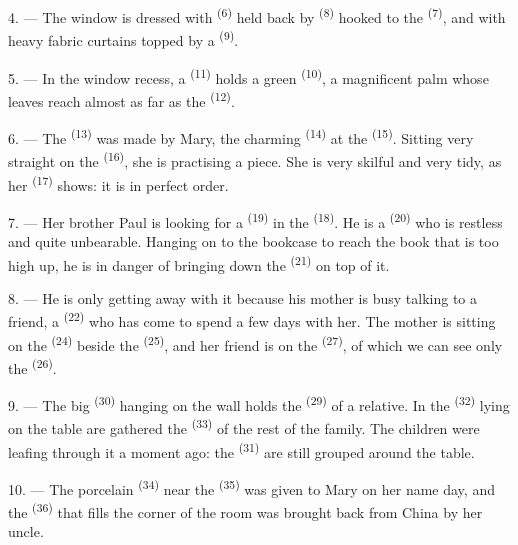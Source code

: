 4. --- The window is dressed with  \textsuperscript{(6)} held back by
 \textsuperscript{(8)} hooked to the  \textsuperscript{(7)}, and
with heavy fabric curtains topped by a
 \textsuperscript{(9)}.

5. --- In the window recess, a  \textsuperscript{(11)} holds a green
 \textsuperscript{(10)}, a magnificent palm whose leaves reach almost as far as
the  \textsuperscript{(12)}.

6. --- The  \textsuperscript{(13)} was made by Mary, the charming
 \textsuperscript{(14)} at the  \textsuperscript{(15)}.
Sitting very straight on the  \textsuperscript{(16)}, she is practising a piece.
She is very skilful and very tidy, as her
 \textsuperscript{(17)} shows: it is in perfect order.

\VUsaut{5.0mm}
\VUsaut{3.0mm}

7. --- Her brother Paul is looking for a  \textsuperscript{(19)} in the
 \textsuperscript{(18)}. He is a  \textsuperscript{(20)} who is
restless and quite unbearable. Hanging on to the bookcase to reach the book that is too high
up, he is in danger of bringing down the
 \textsuperscript{(21)} on top of it.

8. --- He is only getting away with it because his mother is busy talking to a friend, a
 \textsuperscript{(22)} who has come to spend a few days with her. The mother is
sitting on the  \textsuperscript{(24)} beside the 
\textsuperscript{(25)}, and her friend is on the  \textsuperscript{(27)}, of
which we can see only the
 \textsuperscript{(26)}.

9. --- The big  \textsuperscript{(30)} hanging on the wall holds the
 \textsuperscript{(29)} of a relative. In the 
\textsuperscript{(32)} lying on the table are gathered the 
\textsuperscript{(33)} of the rest of the family. The children were leafing through it a
moment ago: the  \textsuperscript{(31)} are still grouped around the table.

10. --- The porcelain  \textsuperscript{(34)} near the
 \textsuperscript{(35)} was given to Mary on her name day, and
the  \textsuperscript{(36)} that fills the corner of the room was
brought back from China by her uncle.

